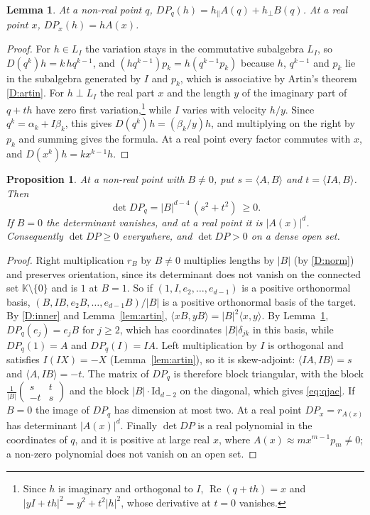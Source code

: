 \documentclass[11pt]{amsart}
\numberwithin{equation}{section}
\theoremstyle{plain}
\newtheorem{proposition}[theorem]{Proposition}
\newtheorem{lemma}[theorem]{Lemma}
\theoremstyle{definition}
\theoremstyle{remark}
\newcommand{\K}{\mathbb{K}}
\renewcommand{\Re}{\operatorname{Re}}
\begin{document}
\begin{lemma}\label{lem:qdiff}
At a non-real point $q$, $DP_q(h)=h_\parallel A(q)+h_\perp B(q)$. At a real point $x$, $DP_x(h)=hA(x)$.
\end{lemma}

\begin{proof}
For $h\in L_I$ the variation stays in the commutative subalgebra $L_I$, so $D(q^k)h=k\,hq^{k-1}$, and $(hq^{k-1})p_k=h(q^{k-1}p_k)$ because $h$, $q^{k-1}$ and $p_k$ lie in the subalgebra generated by $I$ and $p_k$, which is associative by Artin's theorem \ref{D:artin}. For $h\perp L_I$ the real part $x$ and the length $y$ of the imaginary part of $q+th$ have zero first variation,\footnote{Since $h$ is imaginary and orthogonal to $I$, $\Re(q+th)=x$ and $|yI+th|^2=y^2+t^2|h|^2$, whose derivative at $t=0$ vanishes.} while $I$ varies with velocity $h/y$. Since $q^k=\alpha_k+I\beta_k$, this gives $D(q^k)h=(\beta_k/y)h$, and multiplying on the right by $p_k$ and summing gives the formula. At a real point every factor commutes with $x$, and $D(x^k)h=kx^{k-1}h$.
\end{proof}

\begin{proposition}\label{prop:qjac}
At a non-real point with $B\neq0$, put $s=\langle A,B\rangle$ and $t=\langle IA,B\rangle$. Then
\begin{equation}\label{eq:qjac}
\det DP_q=|B|^{d-4}\,(s^2+t^2)\ \ge0 .
\end{equation}
If $B=0$ the determinant vanishes, and at a real point it is $|A(x)|^d$. Consequently $\det DP\ge0$ everywhere, and $\det DP>0$ on a dense open set.
\end{proposition}

\begin{proof}
Right multiplication $r_B$ by $B\neq0$ multiplies lengths by $|B|$ (by \ref{D:norm}) and preserves orientation, since its determinant does not vanish on the connected set $\K\setminus\{0\}$ and is $1$ at $B=1$. So if $(1,I,e_2,\dots,e_{d-1})$ is a positive orthonormal basis, $(B,IB,e_2B,\dots,e_{d-1}B)/|B|$ is a positive orthonormal basis of the target. By \ref{D:inner} and Lemma~\ref{lem:artin}, $\langle xB,yB\rangle=|B|^2\langle x,y\rangle$. By Lemma~\ref{lem:qdiff}, $DP_q(e_j)=e_jB$ for $j\ge2$, which has coordinates $|B|\delta_{jk}$ in this basis, while $DP_q(1)=A$ and $DP_q(I)=IA$. Left multiplication by $I$ is orthogonal and satisfies $I(IX)=-X$ (Lemma~\ref{lem:artin}), so it is skew-adjoint: $\langle IA,IB\rangle=s$ and $\langle A,IB\rangle=-t$. The matrix of $DP_q$ is therefore block triangular, with the block $\frac1{|B|}\left(\begin{smallmatrix}s&t\\-t&s\end{smallmatrix}\right)$ and the block $|B|\cdot\mathrm{Id}_{d-2}$ on the diagonal, which gives \eqref{eq:qjac}. If $B=0$ the image of $DP_q$ has dimension at most two. At a real point $DP_x=r_{A(x)}$ has determinant $|A(x)|^d$. Finally $\det DP$ is a real polynomial in the coordinates of $q$, and it is positive at large real $x$, where $A(x)\approx mx^{m-1}p_m\neq0$; a non-zero polynomial does not vanish on an open set.
\end{proof}
\end{document}
